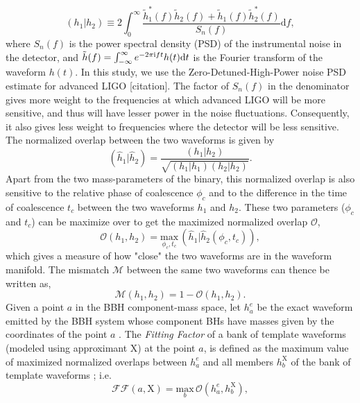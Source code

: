 \documentclass[aps,
prd,
amsmath,
amssymb,
twocolumn,
floatfix,
groupedaddress]{revtex4-1}
\newcommand{\ii}{{\rm i}}
\newcommand{\D}{\mathrm{d}}
\newcommand{\Olap}{\mathcal{O}}
\newcommand{\X}{\mathrm{X}}
\def\l({\left(}
\def\r){\right)}
\begin{document}
\begin{equation}\label{eq:overlap}
(h_1|h_2) \equiv 2\int^{\infty}_0\dfrac{\tilde{h}_1^*(f)\tilde{h}_2(f) + \tilde{h}_1(f)\tilde{h}_2^*(f)}{S_n(f)}\D f,
\end{equation}
where $S_n(f)$ is the power spectral density (PSD) of the instrumental noise in the detector, and $\tilde{h}(f) = \int^{\infty}_{-\infty}e^{-2\pi\ii ft}h(t)\D t$ is the Fourier transform of the waveform $h(t)$. In this study, we use the Zero-Detuned-High-Power noise PSD estimate for advanced LIGO [citation]. The factor of $S_n(f)$ in the denominator gives more weight to the frequencies at which advanced LIGO will be more sensitive, and thus will have lesser power in the noise fluctuations. Consequently, it also gives less weight to frequencies where the detector will be less sensitive. The normalized overlap between the two waveforms is given by
\begin{equation}
(\hat{h}_1|\hat{h}_2) = \dfrac{(h_1|h_2)}{\sqrt{(h_1|h_1)(h_2|h_2)}}.
\end{equation}
Apart from the two mass-parameters of the binary, this normalized overlap is also sensitive to the relative phase of coalescence $\phi_c$ and to the difference in the time of coalescence $t_c$ between the two waveforms $h_1$ and $h_2$. These two parameters ($\phi_c$ and $t_c$) can be maximize over to get the maximized normalized overlap $\Olap$,
\begin{equation}\label{eq:maxnormolap}
\Olap(h_1,h_2) = \underset{\phi_c,t_c}{\mathrm{max}}\,\l(\hat{h}_1|\hat{h}_2(\phi_c,t_c)\r),
\end{equation}
which gives a measure of how  "close" the two waveforms are in the waveform manifold. The mismatch $\mathcal{M}$ between the same two waveforms can thence be written as,
\begin{equation}\label{eq:mismatch}
\mathcal{M}(h_1,h_2) = 1 - \Olap(h_1,h_2).
\end{equation}
Given a point $a$ in the BBH component-mass space, let $h^e_a$ be the exact waveform emitted by the BBH system whose component BHs have masses given by the coordinates of the point $a$ . The \textit{Fitting Factor} of a bank of template waveforms (modeled using approximant $\X$) at the point $a$, is defined as the maximum value of maximized normalized overlaps between $h^e_a$ and all members $h^{\X}_b$ of the bank of template waveforms \citep{FittingFactorApostolatos}; i.e.
\begin{equation}\label{eq:defFF}
\mathcal{FF}(a,\X) = \underset{b}{\textrm{max}}\,\Olap(h^e_a,h^{\X}_b),
\end{equation}
\end{document}
